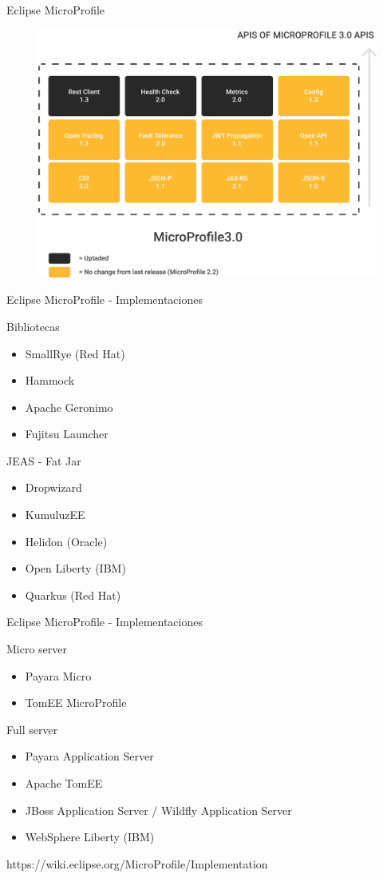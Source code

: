 \documentclass[aspectratio=169]{beamer}
\begin{document}
\begin{frame}{Eclipse MicroProfile}
\begin{figure}
	\centering
	\includegraphics[width=0.9\linewidth]{Images/microprofileapis}
\end{figure}
\end{frame}


\begin{frame}{Eclipse MicroProfile - Implementaciones}

Bibliotecas
\begin{itemize}
	\item SmallRye (Red Hat)
	\item Hammock
	\item Apache Geronimo
	\item Fujitsu Launcher
\end{itemize}

JEAS - Fat Jar
\begin{itemize}
	\item Dropwizard
	\item KumuluzEE
	\item Helidon (Oracle)
	\item Open Liberty (IBM)
	\item Quarkus (Red Hat)
\end{itemize}

\end{frame}
\begin{frame}{Eclipse MicroProfile - Implementaciones}

Micro server
\begin{itemize}
	\item Payara Micro
	\item TomEE MicroProfile
\end{itemize}

Full server
\begin{itemize}
	\item Payara Application Server
    \item Apache TomEE
	\item JBoss Application Server / Wildfly Application Server
	\item WebSphere Liberty (IBM)
\end{itemize}

https://wiki.eclipse.org/MicroProfile/Implementation
\end{frame}
\end{document}
